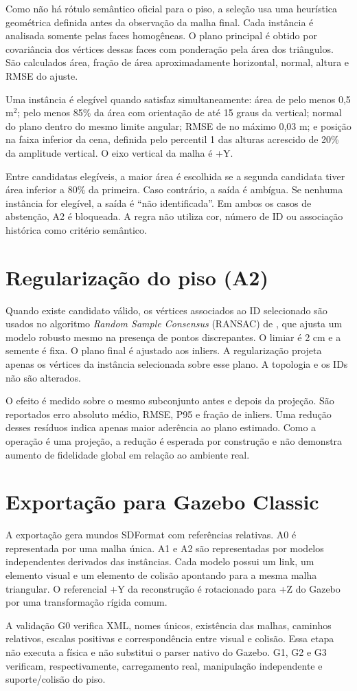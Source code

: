Como não há rótulo semântico oficial para o piso, a seleção usa uma heurística geométrica definida antes da observação da malha final. Cada instância é analisada somente pelas faces homogêneas. O plano principal é obtido por covariância dos vértices dessas faces com ponderação pela área dos triângulos. São calculados área, fração de área aproximadamente horizontal, normal, altura e RMSE do ajuste.

Uma instância é elegível quando satisfaz simultaneamente: área de pelo menos 0,5 m$^2$; pelo menos 85\% da área com orientação de até 15 graus da vertical; normal do plano dentro do mesmo limite angular; RMSE de no máximo 0,03 m; e posição na faixa inferior da cena, definida pelo percentil 1 das alturas acrescido de 20\% da amplitude vertical. O eixo vertical da malha é +Y.

Entre candidatas elegíveis, a maior área é escolhida se a segunda candidata tiver área inferior a 80\% da primeira. Caso contrário, a saída é ambígua. Se nenhuma instância for elegível, a saída é ``não identificada''. Em ambos os casos de abstenção, A2 é bloqueada. A regra não utiliza cor, número de ID ou associação histórica como critério semântico.

\section{Regularização do piso (A2)}

Quando existe candidato válido, os vértices associados ao ID selecionado são usados no algoritmo \textit{Random Sample Consensus} (RANSAC) de \citet{fischler1981ransac}, que ajusta um modelo robusto mesmo na presença de pontos discrepantes. O limiar é 2 cm e a semente é fixa. O plano final é ajustado aos inliers. A regularização projeta apenas os vértices da instância selecionada sobre esse plano. A topologia e os IDs não são alterados.

O efeito é medido sobre o mesmo subconjunto antes e depois da projeção. São reportados erro absoluto médio, RMSE, P95 e fração de inliers. Uma redução desses resíduos indica apenas maior aderência ao plano estimado. Como a operação é uma projeção, a redução é esperada por construção e não demonstra aumento de fidelidade global em relação ao ambiente real.

\section{Exportação para Gazebo Classic}

A exportação gera mundos SDFormat com referências relativas. A0 é representada por uma malha única. A1 e A2 são representadas por modelos independentes derivados das instâncias. Cada modelo possui um link, um elemento visual e um elemento de colisão apontando para a mesma malha triangular. O referencial +Y da reconstrução é rotacionado para +Z do Gazebo por uma transformação rígida comum.

A validação G0 verifica XML, nomes únicos, existência das malhas, caminhos relativos, escalas positivas e correspondência entre visual e colisão. Essa etapa não executa a física e não substitui o parser nativo do Gazebo. G1, G2 e G3 verificam, respectivamente, carregamento real, manipulação independente e suporte/colisão do piso.
